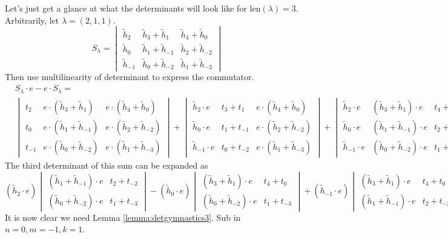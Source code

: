 \begin{example}
Let's just get a glance at what the determinants will look like for $\textrm{len}(\lambda)=3$. Arbitrarily, let $\lambda = (2, 1, 1)$. 
\[
S_\lambda = 
\begin{vmatrix}
\tilde{h}_2 & \tilde{h}_3 + \tilde{h}_1 & \tilde{h}_4 + \tilde{h}_0 \\
\tilde{h}_0 & \tilde{h}_1 + \tilde{h}_{-1} & \tilde{h}_2 + \tilde{h}_{-2} \\
\tilde{h}_{-1} & \tilde{h}_0 + \tilde{h}_{-2} & \tilde{h}_1 + \tilde{h}_{-3}
\end{vmatrix}
\]
Then use multilinearity of determinant to express the commutator.
\begin{equation*}
\begin{split}
&S_\lambda \cdot e - e \cdot S_\lambda = \\
&\begin{vmatrix}
t_2 & e \cdot (\tilde{h}_3 + \tilde{h}_1 ) & e \cdot ( \tilde{h}_4 + \tilde{h}_0 ) \\
t_0 & e \cdot ( \tilde{h}_1 + \tilde{h}_{-1} ) & e \cdot ( \tilde{h}_2  + \tilde{h}_{-2} ) \\
t_{-1} & e \cdot ( \tilde{h}_0 + \tilde{h}_{-2} ) & e \cdot ( \tilde{h}_1 + \tilde{h}_{-3} )
\end{vmatrix}
+
\begin{vmatrix}
\tilde{h}_2 \cdot e & t_3 + t_1 & e \cdot ( \tilde{h}_4 + \tilde{h}_0 ) \\
\tilde{h}_0 \cdot e & t_1 + t_{-1} & e \cdot ( \tilde{h}_2  + \tilde{h}_{-2} ) \\
\tilde{h}_{-1} \cdot e & t_0 + t_{-2} & e \cdot ( \tilde{h}_1 + \tilde{h}_{-3} )
\end{vmatrix}
+
\begin{vmatrix}
\tilde{h}_2 \cdot e & ( \tilde{h}_3 + \tilde{h}_1 ) \cdot e & t_4 + t_0 \\
\tilde{h}_0 \cdot e & ( \tilde{h}_1 + \tilde{h}_{-1} ) \cdot e & t_2  + t_{-2} ) \\
\tilde{h}_{-1} \cdot e & ( \tilde{h}_0 + \tilde{h}_{-2} ) \cdot e & t_1 + t_{-3}
\end{vmatrix}
\end{split}
\end{equation*}
The third determinant of this sum can be expanded as
\[
( \tilde{h}_2 \cdot e )
\begin{vmatrix}
( \tilde{h}_1 + \tilde{h}_{-1} ) \cdot e & t_2 + t_{-2} \\
( \tilde{h}_0 + \tilde{h}_{-2} ) \cdot e & t_1 + t_{-3}
\end{vmatrix}
- ( \tilde{h}_0 \cdot e ) 
\begin{vmatrix}
( \tilde{h}_3 + \tilde{h}_1 ) \cdot e & t_4 + t_0 \\
( \tilde{h}_0 + \tilde{h}_{-2} ) \cdot e & t_1 + t_{-3}
\end{vmatrix}
+ ( \tilde{h}_{-1} \cdot e ) 
\begin{vmatrix}
( \tilde{h}_3 + \tilde{h}_1 ) \cdot e & t_4 + t_0 \\
( \tilde{h}_1 + \tilde{h}_{-1}) \cdot e & t_2 + t_{-2}
\end{vmatrix}
\]
It is now clear we need Lemma \ref{lemma:detgymnastics3}. Sub in $n=0, m=-1, k=1$.


\end{example}
